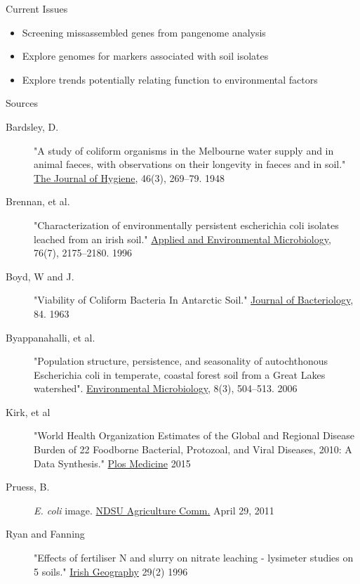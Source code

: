 \documentclass[17pt,aspectratio=169]{beamer}
\begin{document}
\begin{frame}[label={sec:orgbbb97da}]{Current Issues}
\begin{itemize}
\item Screening missassembled genes from pangenome analysis
\item Explore genomes for markers associated with soil isolates
\item Explore trends potentially relating function to environmental factors
\end{itemize}
\end{frame}


\begin{frame}[label={sec:orgb172077}]{Sources}
\tiny
\begin{description}
\item[{Bardsley, D.}] "A study of coliform organisms in the Melbourne water supply and in animal faeces, with observations on their longevity in faeces and in soil." \uline{The Journal of Hygiene}, 46(3), 269–79. 1948
\item[{Brennan, et al.}] "Characterization of environmentally persistent escherichia coli isolates leached from an irish soil." \uline{Applied and Environmental Microbiology}, 76(7), 2175–2180. 1996
\item[{Boyd, W and J.}] "Viability of Coliform Bacteria In Antarctic Soil." \uline{Journal of Bacteriology}, 84. 1963
\item[{Byappanahalli, et al.}] "Population structure, persistence, and seasonality of autochthonous Escherichia coli in temperate, coastal forest soil from a Great Lakes watershed". \uline{Environmental Microbiology}, 8(3), 504–513. 2006
\item[{Kirk, et al}] "World Health Organization Estimates of the Global and Regional Disease Burden of 22 Foodborne Bacterial, Protozoal, and Viral Diseases, 2010: A Data Synthesis." \uline{Plos Medicine} 2015
\item[{Pruess, B.}] \emph{E. coli} image. \uline{NDSU Agriculture Comm.} April 29, 2011
\item[{Ryan and Fanning}] "Effects of fertiliser N and slurry on nitrate leaching - lysimeter studies on 5 soils." \uline{Irish Geography}  29(2) 1996
\end{description}
\end{frame}
\end{document}
